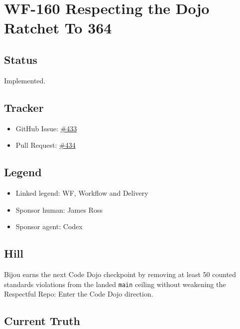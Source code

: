 \chapter{WF-160 Respecting the Dojo Ratchet To 364}\label{record-242}

\smallskip

\section{Status}\label{record-242-status}

Implemented.

\section{Tracker}\label{record-242-tracker}

\begin{itemize}
\tightlist
\item
  GitHub Issue: \href{https://github.com/flyingrobots/bijou/issues/433}{\#433}
\item
  Pull Request: \href{https://github.com/flyingrobots/bijou/pull/434}{\#434}
\end{itemize}

\section{Legend}\label{record-242-legend}

\begin{itemize}
\tightlist
\item
  Linked legend: WF, Workflow and Delivery
\item
  Sponsor human: James Ross
\item
  Sponsor agent: Codex
\end{itemize}

\section{Hill}\label{record-242-hill}

Bijou earns the next Code Dojo checkpoint by removing at least 50 counted standards violations from the landed \texttt{m\allowbreak{}a\allowbreak{}i\allowbreak{}n} ceiling without weakening the Respectful Repo: Enter the Code Dojo direction.

\section{Current Truth}\label{record-242-current-truth}

